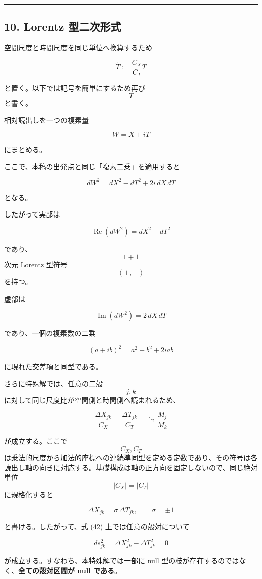 \documentclass[
  a4paper,
]{ltjsarticle}
\begin{document}
\begin{center}\rule{0.5\linewidth}{0.5pt}\end{center}

\subsection{10. Lorentz
型二次形式}\label{lorentz-ux578bux4e8cux6b21ux5f62ux5f0f}

空間尺度と時間尺度を同じ単位へ換算するため

\[
\widetilde T
:=
\frac{C_X}{C_T}T
\]

と置く。以下では記号を簡単にするため再び \[T\] と書く。

相対読出しを一つの複素量

\[
\boxed{
W=X+iT
}
\tag{40}
\]

にまとめる。

ここで、本稿の出発点と同じ「複素二乗」を適用すると

\[
\boxed{
dW^2
=dX^2-dT^2+2i\,dX\,dT
}
\tag{41}
\]

となる。

したがって実部は

\[
\boxed{
\operatorname{Re}(dW^2)
=dX^2-dT^2
}
\tag{42}
\]

であり、\[1+1\] 次元 Lorentz 型符号 \[(+,-)\] を持つ。

虚部は

\[
\boxed{
\operatorname{Im}(dW^2)
=2\,dX\,dT
}
\tag{43}
\]

であり、一個の複素数の二乗

\[
(a+ib)^2=a^2-b^2+2iab
\]

に現れた交差項と同型である。

さらに特殊解では、任意の二殻 \[j,k\]
に対して同じ尺度比が空間側と時間側へ読まれるため、

\[
\frac{\Delta X_{jk}}{C_X}
=
\frac{\Delta T_{jk}}{C_T}
=
\ln\frac{M_j}{M_k}
\]

が成立する。ここで \[C_X,C_T\]
は乗法的尺度から加法的座標への連続準同型を定める定数であり、その符号は各読出し軸の向きに対応する。基礎構成は軸の正方向を固定しないので、同じ絶対単位
\[|C_X|=|C_T|\] に規格化すると

\[
\Delta X_{jk}
=
\sigma\,\Delta T_{jk},
\qquad
\sigma=\pm1
\]

と書ける。したがって、式 (42) 上では任意の殻対について

\[
\boxed{
ds_{jk}^2
=
\Delta X_{jk}^2-\Delta T_{jk}^2
=0
}
\tag{44}
\]

が成立する。すなわち、本特殊解では一部に null
型の枝が存在するのではなく、\textbf{全ての殻対区間が null である}。
\end{document}
